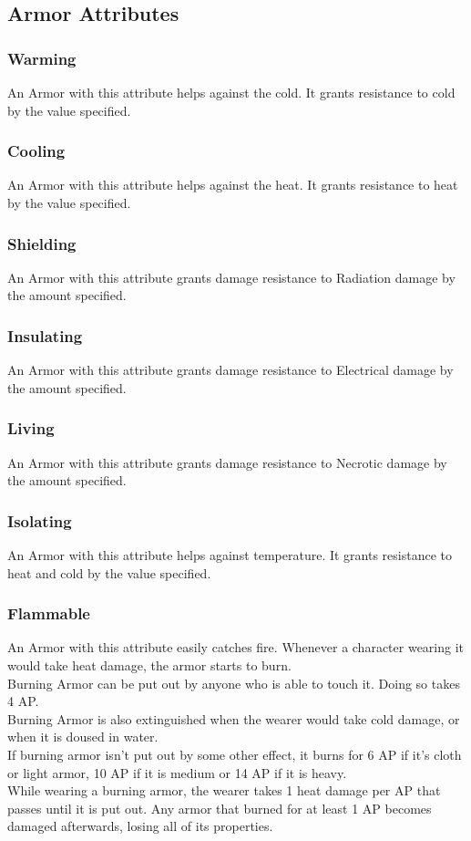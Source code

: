 \subsection{Armor Attributes}

\subsubsection{Warming}
An Armor with this attribute helps against the cold. It grants resistance to cold by the value specified.

\subsubsection{Cooling}
An Armor with this attribute helps against the heat. It grants resistance to heat by the value specified.

\subsubsection{Shielding}
An Armor with this attribute grants damage resistance to Radiation damage by the amount specified.

\subsubsection{Insulating}
An Armor with this attribute grants damage resistance to Electrical damage by the amount specified.

\subsubsection{Living}
An Armor with this attribute grants damage resistance to Necrotic damage by the amount specified.

\subsubsection{Isolating}
An Armor with this attribute helps against temperature. It grants resistance to heat and cold by the value specified.

\subsubsection{Flammable}
An Armor with this attribute easily catches fire. Whenever a character wearing it would take heat damage, the armor starts to burn.\\
Burning Armor can be put out by anyone who is able to touch it. Doing so takes 4 AP.\\
Burning Armor is also extinguished when the wearer would take cold damage, or when it is doused in water.\\
If burning armor isn't put out by some other effect, it burns for 6 AP if it's cloth or light armor, 10 AP if it is medium or 14 AP if it is heavy.\\
While wearing a burning armor, the wearer takes 1 heat damage per AP that passes until it is put out. Any armor that burned for at least 1 AP becomes damaged afterwards, losing all of its properties.

